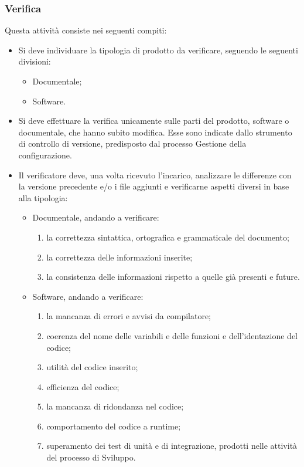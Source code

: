 \subsubsection{Verifica}
Questa attività consiste nei seguenti compiti:
\begin{itemize}
    \item Si deve individuare la tipologia di prodotto da verificare, seguendo le seguenti divisioni:
    \begin{itemize}
        \item Documentale;
        \item Software.
    \end{itemize}
    \item Si deve effettuare la verifica unicamente sulle parti del prodotto, software o documentale, che hanno subito modifica.  Esse sono indicate dallo strumento di controllo di versione,  predisposto dal processo Gestione della configurazione.
    \item Il verificatore deve, una volta ricevuto l'incarico, analizzare le differenze con la versione precedente e/o i file aggiunti e verificarne aspetti diversi in base alla tipologia:
    \begin{itemize}
        \item Documentale, andando a verificare:
        \begin{enumerate}
            \item la correttezza sintattica, ortografica e grammaticale del documento;
            \item la correttezza delle informazioni inserite;
            \item la consistenza delle informazioni rispetto a quelle già presenti e future.
        \end{enumerate}
        \item Software, andando a verificare:
        \begin{enumerate}
            \item la mancanza di errori e avvisi da compilatore;
            \item coerenza del nome delle variabili e delle funzioni e dell'identazione del codice;
            \item utilità del codice inserito;
            \item efficienza del codice;
            \item la mancanza di ridondanza nel codice;
            \item comportamento del codice a runtime;
            \item superamento dei test di unità e di integrazione, prodotti nelle attività del processo di Sviluppo.

\end{enumerate}
\end{itemize}
\end{itemize}
